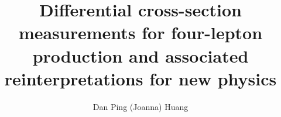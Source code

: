 \documentclass[hyperpdf,bindnopdf]{hepthesis}
\title{Differential cross-section measurements for four-lepton production and associated reinterpretations for new physics}
\author{Dan Ping (Joanna) Huang}
\begin{document}
\begin{frontmatter}
  
  
\end{frontmatter}

\begin{mainmatter}
    
  
  
  
  
\end{mainmatter}

\begin{appendices}
  
  
\end{appendices}

\begin{backmatter}
  
\end{backmatter}

\end{document}
